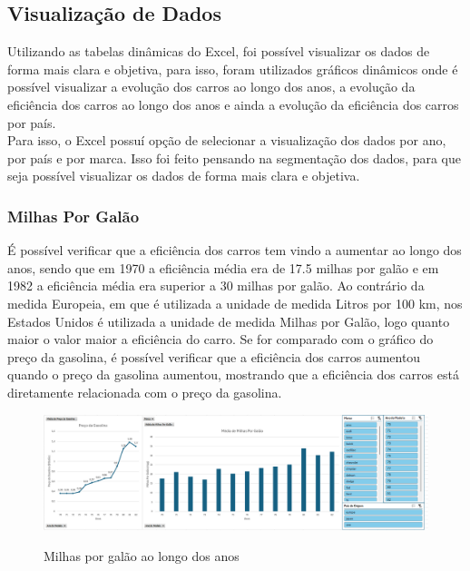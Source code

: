 \documentclass[a4paper]{article}
\begin{document}
\subsection{Visualização de Dados}
Utilizando as tabelas dinâmicas do Excel, foi possível visualizar os dados de forma mais clara e objetiva,
para isso, foram utilizados gráficos dinâmicos onde é possível visualizar a evolução dos carros ao longo dos anos,
a evolução da eficiência dos carros ao longo dos anos e ainda a evolução da eficiência dos carros por país.
\\
Para isso, o Excel possuí opção de selecionar a visualização dos dados por ano, por país e por marca.
Isso foi feito pensando na segmentação dos dados, para que seja possível visualizar os dados de forma mais clara e objetiva.

\newpage

\subsubsection{Milhas Por Galão}
É possível verificar que a eficiência dos carros tem vindo a aumentar ao longo dos anos,
sendo que em 1970 a eficiência média era de 17.5 milhas por galão e em 1982 a eficiência média 
era superior a 30 milhas por galão. Ao contrário da medida Europeia, em que é utilizada a unidade de medida
Litros por 100 km, nos Estados Unidos é utilizada a unidade de medida Milhas por Galão, logo quanto maior o valor
maior a eficiência do carro.
Se for comparado com o gráfico do preço da gasolina, é possível verificar que a eficiência dos carros aumentou
quando o preço da gasolina aumentou, mostrando que a eficiência dos carros está diretamente relacionada com o preço da gasolina.

\begin{figure}[h!]
    \raggedright
    \includegraphics[width=1.2\textwidth]{Recursos/MilhasPorGalaoGrafico.png} %
    \vspace{0.5cm}
    \label{fig:mpg}
    \caption{Milhas por galão ao longo dos anos}
\end{figure}
\newpage
\end{document}
